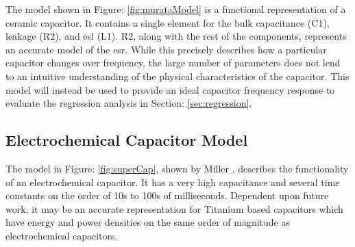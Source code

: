 The model shown in Figure: \ref{fig:murataModel} is a functional representation of a ceramic capacitor. It contains a single element for the bulk capacitance (C1), leakage (R2), and \gls{esl} (L1). R2, along with the rest of the components, represents an accurate model of the \gls{esr}. While this precisely describes how a particular capacitor changes over frequency, the large number of parameters does not lend to an intuitive understanding of the physical characteristics of the capacitor. This model will instead be used to provide an ideal capacitor frequency response to evaluate the regression analysis in Section: \ref{sec:regression}.

\subsection{Electrochemical Capacitor Model}


The model in Figure: \ref{fig:superCap}, shown by Miller \cite{electrochem_intro}, describes the functionality of an electrochemical capacitor. It has a very high capacitance and several time constants on the order of 10s to 100s of milliseconds. Dependent upon future work, it may be an accurate representation for Titanium based capacitors which have energy and power densities on the same order of magnitude as electrochemical capacitors.

